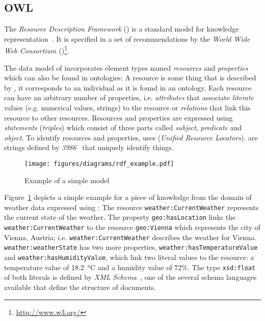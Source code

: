 \subsection{OWL}
\label{subsec:owl}

The \emph{Resource Description Framework} () is a standard model for knowledge representation~\cite{RDF}. It is specified in a set of recommendations by the \emph{World Wide Web Consortium} ()\footnote{\href{http://www.w3.org/}{http://www.w3.org/}}.

The data model of  incorporates element types named \emph{resources} and \emph{properties} which can also be found in ontologies: A resource is some thing that is described by , it corresponds to an individual as it is found in an ontology. Each resource can have an arbitrary number of properties, i.e. \emph{attributes} that associate \emph{literate} values (e.g. numerical values, strings) to the resource or \emph{relations} that link this resource to other resources. Resources and properties are expressed using \emph{statements} (\emph{triples}) which consist of three parts called \emph{subject}, \emph{predicate} and \emph{object}. To identify resources and properties,  uses  (\emph{Unified Resource Locators}).  are strings defined by \emph{ 3986}~\cite{rfc3986} that uniquely identify things.

\begin{figure}
\centering
\texttt{[image: figures/diagrams/rdf\_example.pdf]}
\caption{Example of a simple  model}
\label{fig:rdf_example}
\end{figure}

Figure~\ref{fig:rdf_example} depicts a simple example for a piece of knowledge from the domain of weather data expressed using : The resource \texttt{weather:CurrentWeather} represents the current state of the weather. The property \texttt{geo:hasLocation} links the \texttt{weather:CurrentWeather} to the resource \texttt{geo:Vienna} which represents the city of Vienna, Austria; i.e. \texttt{weather:CurrentWeather} describes the weather for Vienna. \texttt{weather:weatherState} has two more properties, \texttt{weather:hasTemperatureValue} and \texttt{weather:hasHumidityValue}, which link two literal values to the resource: a temperature value of \SI{18.2}{\celsius} and a humidity value of $72 \%$. The type \texttt{xsd:float} of both literals is defined by \emph{XML Schema}~\cite{xml-schema,xml-schema-datatypes}, one of the several  schema languages available that define the structure of  documents.


